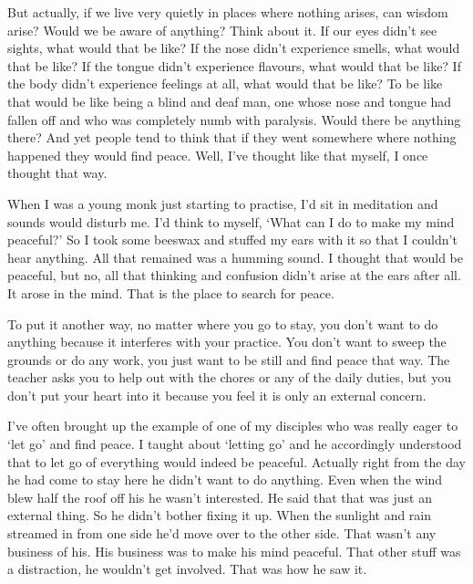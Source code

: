 But actually, if we live very quietly in places where nothing arises, can wisdom arise? Would we be aware of anything? Think about it. If our eyes didn't see sights, what would that be like? If the nose didn't experience smells, what would that be like? If the tongue didn't experience flavours, what would that be like? If the body didn't experience feelings at all, what would that be like? To be like that would be like being a blind and deaf man, one whose nose and tongue had fallen off and who was completely numb with paralysis. Would there be anything there? And yet people tend to think that if they went somewhere where nothing happened they would find peace. Well, I've thought like that myself, I once thought that way.

When I was a young monk just starting to practise, I'd sit in meditation and sounds would disturb me. I'd think to myself, `What can I do to make my mind peaceful?' So I took some beeswax and stuffed my ears with it so that I couldn't hear anything. All that remained was a humming sound. I thought that would be peaceful, but no, all that thinking and confusion didn't arise at the ears after all. It arose in the mind. That is the place to search for peace. 

To put it another way, no matter where you go to stay, you don't want to do anything because it interferes with your practice. You don't want to sweep the grounds or do any work, you just want to be still and find peace that way. The teacher asks you to help out with the chores or any of the daily duties, but you don't put your heart into it because you feel it is only an external concern. 

I've often brought up the example of one of my disciples who was really eager to `let go' and find peace. I taught about `letting go' and he accordingly understood that to let go of everything would indeed be peaceful. Actually right from the day he had come to stay here he didn't want to do anything. Even when the wind blew half the roof off his  he wasn't interested. He said that that was just an external thing. So he didn't bother fixing it up. When the sunlight and rain streamed in from one side he'd move over to the other side. That wasn't any business of his. His business was to make his mind peaceful. That other stuff was a distraction, he wouldn't get involved. That was how he saw it. 


